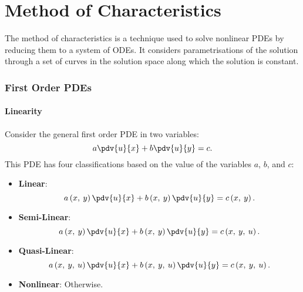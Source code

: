 \documentclass{article}
\theoremstyle{definition}
\begin{document}
\part{Method of Characteristics}
The method of characteristics is a technique used to solve nonlinear
PDEs by reducing them to a system of ODEs. It considers
parametrisations of the solution through a set of curves in the
solution space along which the solution is constant.
\section{First Order PDEs}
\subsection{Linearity}
Consider the general first order PDE in two variables:
\begin{equation*}
    a \pdv{u}{x} + b \pdv{u}{y} = c.
\end{equation*}
This PDE has four classifications based on the value of the
variables \(a\), \(b\), and \(c\):
\begin{itemize}
    \item \textbf{Linear}:
          \begin{equation*}
              a\left( x,\: y \right) \pdv{u}{x} + b\left( x,\: y \right) \pdv{u}{y} = c\left( x,\: y \right).
          \end{equation*}
    \item \textbf{Semi-Linear}:
          \begin{equation*}
              a\left( x,\: y \right) \pdv{u}{x} + b\left( x,\: y \right) \pdv{u}{y} = c\left( x,\: y,\: u \right).
          \end{equation*}
    \item \textbf{Quasi-Linear}:
          \begin{equation*}
              a\left( x,\: y,\: u \right) \pdv{u}{x} + b\left( x,\: y,\: u \right) \pdv{u}{y} = c\left( x,\: y,\: u \right).
          \end{equation*}
    \item \textbf{Nonlinear}: Otherwise.
\end{itemize}
\end{document}
